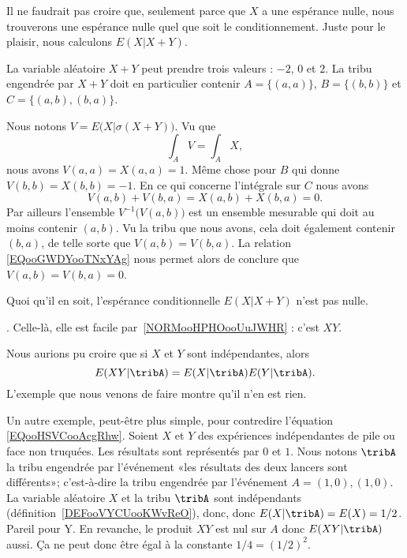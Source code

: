 \begin{subproof}
	\spitem[Calcul de \( E(X|X+Y)\)] Il ne faudrait pas croire que, seulement parce que \( X\) a une espérance nulle, nous trouverons une espérance nulle quel que soit le conditionnement. Juste pour le plaisir, nous calculons \( E(X|X+Y)\).

	La variable aléatoire \( X+Y\) peut prendre trois valeurs : \( -2\), \( 0\) et \( 2\). La tribu engendrée par \( X+Y\) doit en particulier contenir \( A=\{ (a,a) \}\), \( B=\{ (b,b) \}\) et \( C=\{ (a,b),(b,a) \}\).

	Nous notons \( V=E\big( X|\sigma(X+Y) \big)\). Vu que
	\begin{equation}
		\int_AV=\int_AX,
	\end{equation}
	nous avons \( V(a,a)=X(a,a)=1\). Même chose pour \( B\) qui donne \( V(b,b)=X(b,b)=-1\). En ce qui concerne l'intégrale sur \( C\) nous avons
	\begin{equation}        \label{EQooGWDYooTNxYAg}
		V(a,b)+V(b,a)=X(a,b)+X(b,a)=0.
	\end{equation}
	Par ailleurs l'ensemble \( V^{-1}\big( V(a,b) \big)\) est un ensemble mesurable qui doit au moins contenir \( (a,b)\). Vu la tribu que nous avons, cela doit également contenir \( (b,a)\), de telle sorte que \( V(a,b)=V(b,a)\). La relation \eqref{EQooGWDYooTNxYAg} nous permet alors de conclure que \( V(a,b)=V(b,a)=0\).

	Quoi qu'il en soit, l'espérance conditionnelle \( E(X|X+Y)\) n'est pas nulle.

	. Celle-là, elle est facile par~\ref{NORMooHPHOooUuJWHR} : c'est \( XY\).

\end{subproof}

Nous aurions pu croire que si \( X\) et \( Y\) sont indépendantes, alors
\begin{equation}        \label{EQooHSVCooAcgRhw}
	E(XY|\tribA)=E(X|\tribA)E(Y|\tribA).
\end{equation}
L'exemple que nous venons de faire montre qu'il n'en est rien.

\begin{example}
	Un autre exemple, peut-être plus simple, pour contredire l'équation \eqref{EQooHSVCooAcgRhw}. Soient \( X\) et \( Y\) des expériences indépendantes de pile ou face non truquées. Les résultats sont représentés par \( 0\) et \( 1\). Nous notons \( \tribA\)  la tribu engendrée par l'événement «les résultats des deux lancers sont différents»; c'est-à-dire la tribu engendrée par l'événement \( A={(1,0),(1,0)}\). La variable aléatoire \( X\) et la tribu \( \tribA\) sont indépendants (définition~\ref{DEFooVYCUooKWvReO}), donc, donc \( E(X|\tribA)=E(X)=1/2\). Pareil pour Y. En revanche, le produit \( XY\) est nul sur \( A\) donc \( E(XY|\tribA)\) aussi. Ça ne peut donc être égal à la constante \( 1/4=(1/2)^2\).
\end{example}

